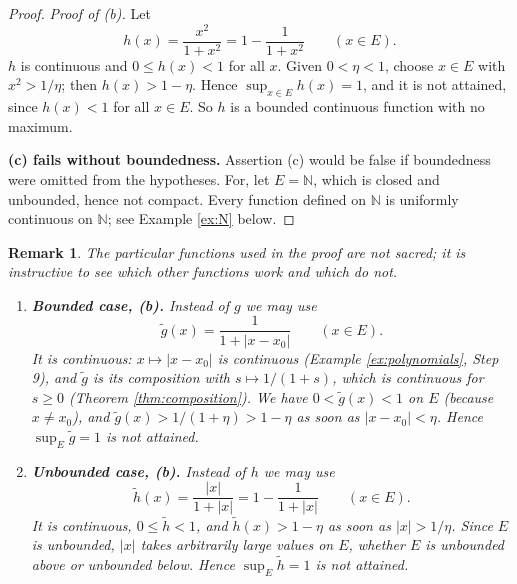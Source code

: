 \documentclass{article}
\theoremstyle{mythm}
\newtheorem{remark}[theorem]{Remark}
\begin{document}
\begin{proof}
\textit{Proof of (b).} Let
\[
h(x) = \frac{x^2}{1 + x^2} = 1 - \frac{1}{1 + x^2} \qquad (x \in E).
\]
$h$ is continuous and $0 \leq h(x) < 1$ for all $x$. Given $0 < \eta < 1$, choose $x \in E$ with $x^2 > 1/\eta$; then $h(x) > 1 - \eta$. Hence $\sup_{x \in E} h(x) = 1$, and it is not attained, since $h(x) < 1$ for all $x \in E$. So $h$ is a bounded continuous function with no maximum.

\textbf{(c) fails without boundedness.} Assertion (c) would be false if boundedness were omitted from the hypotheses. For, let $E = \mathbb{N}$, which is closed and unbounded, hence not compact. Every function defined on $\mathbb{N}$ is uniformly continuous on $\mathbb{N}$; see Example \ref{ex:N} below.
\end{proof}

\begin{remark}\label{rem:otherfns}
The particular functions used in the proof are not sacred; it is instructive to see which other functions work and which do not.
\begin{enumerate}
    \item \textbf{Bounded case, (b).} Instead of $g$ we may use
    \[
    \tilde g(x) = \frac{1}{1 + |x - x_0|} \qquad (x \in E).
    \]
    It is continuous: $x \mapsto |x - x_0|$ is continuous (Example \ref{ex:polynomials}, Step 9), and $\tilde g$ is its composition with $s \mapsto 1/(1+s)$, which is continuous for $s \geq 0$ (Theorem \ref{thm:composition}). We have $0 < \tilde g(x) < 1$ on $E$ (because $x \neq x_0$), and $\tilde g(x) > 1/(1+\eta) > 1 - \eta$ as soon as $|x - x_0| < \eta$. Hence $\sup_E \tilde g = 1$ is not attained.

    \item \textbf{Unbounded case, (b).} Instead of $h$ we may use
    \[
    \tilde h(x) = \frac{|x|}{1 + |x|} = 1 - \frac{1}{1 + |x|} \qquad (x \in E).
    \]
    It is continuous, $0 \leq \tilde h < 1$, and $\tilde h(x) > 1 - \eta$ as soon as $|x| > 1/\eta$. Since $E$ is unbounded, $|x|$ takes arbitrarily large values on $E$, whether $E$ is unbounded above or unbounded below. Hence $\sup_E \tilde h = 1$ is not attained.


\end{enumerate}
\end{remark}
\end{document}
